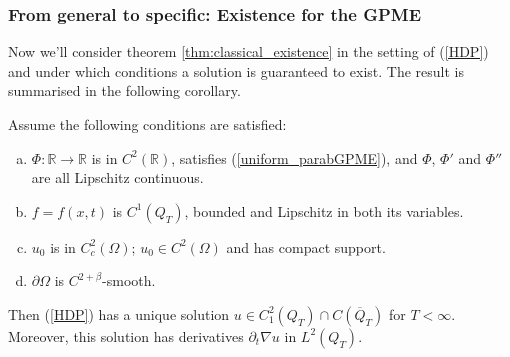 \documentclass[11pt, a4paper]{article}
\begin{document}
\subsubsection{From general to specific: Existence for the GPME}
Now we'll consider theorem \ref{thm:classical_existence} in the setting of (\ref{HDP}) and under which conditions a solution is guaranteed to exist. The result is summarised in the following corollary.

\begin{cor}
\label{cor:GPME_existence}
Assume the following conditions are satisfied:
	\begin{enumerate}[a)]
		\item 	$\Phi: \mathbb{R} \to \mathbb{R}$ is in $C^2(\mathbb{R})$, satisfies (\ref{uniform_parabGPME}), and $\Phi$, $\Phi'$ and $\Phi''$ are all Lipschitz continuous.
		
		\item $f = f(x,t)$ is $C^1(Q_T)$, bounded and Lipschitz in both its variables.
		
		\item $u_0$ is in $C^2_c(\Omega)$; $u_0\in C^2(\Omega)$ and has compact support.
		
		\item $\partial \Omega$ is $C^{2+\beta}$-smooth.
	
	\end{enumerate}
Then (\ref{HDP}) has a unique solution $u\in C^{2}_1(Q_T)\cap C(\overline{Q}_T)$ for $T<\infty$. Moreover, this solution has derivatives $\partial_t \nabla u$ in $L^2(Q_T)$.
\end{cor}
\end{document}
